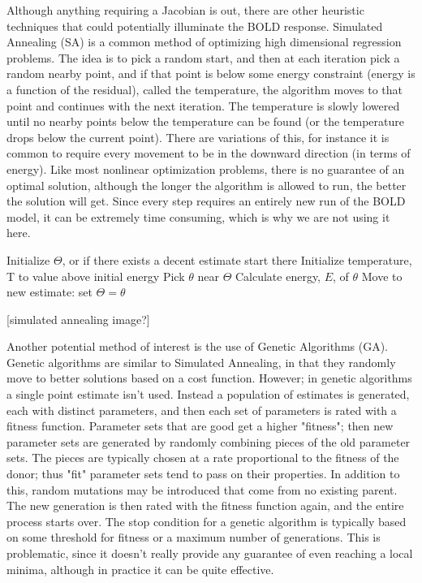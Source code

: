 Although anything requiring a Jacobian is out, there are other heuristic
techniques that could potentially illuminate the BOLD response. 
Simulated Annealing (SA) is a common method of optimizing high dimensional
regression problems. The idea is to pick a random start, and then
at each iteration pick a random nearby point, and if that point is
below some energy constraint (energy is a function of the residual), 
called the temperature, the algorithm moves
to that point and continues with the next iteration. The temperature
is slowly lowered until no nearby points below the temperature can
be found (or the temperature drops below the current point). There are
variations of this, for instance it is common to require every movement
to be in the downward direction (in terms of energy). Like most nonlinear
optimization problems, there is no guarantee of an optimal solution,
although the longer the algorithm is allowed to run, the better the solution
will get. Since every step requires an entirely new run of the 
BOLD model, it can be extremely time consuming, which is why we are
not using it here.

\begin{algorithm}
\caption{Simulated Annealing Algorithm}
\label{alg:Simulated Annealing}
\begin{algorithmic}
\STATE Initialize $\Theta$, or if there exists a decent estimate start there
\STATE Initialize temperature, T to value above initial energy
    \REPEAT
        \STATE Pick $\theta$ near $\Theta$
        \STATE Calculate energy, $E$, of $\theta$
    \STATE Move to new estimate: set $\Theta = \theta$
\ENDWHILE
\end{algorithmic}
\end{algorithm}

[simulated annealing image?]

Another potential method of interest is the use of Genetic Algorithms
(GA). Genetic algorithms are similar to Simulated Annealing, in
that they randomly move to better solutions based on a cost function.
However; in genetic algorithms a single point estimate isn't used. Instead
a population of estimates is generated, each with distinct parameters,
and then each set of parameters is rated with a fitness function. Parameter
sets that are good get a higher "fitness"; then new parameter sets are generated by 
randomly combining pieces of the old parameter sets. The pieces are typically
chosen at a rate proportional to the fitness of the donor; thus "fit"
parameter sets tend to pass on their properties. In addition to this,
random mutations may be introduced that come from no existing parent. 
The new generation is then rated with the fitness function again, and
the entire process starts over. The stop condition for a genetic algorithm
is typically based on some threshold for fitness or a maximum number 
of generations. This is problematic, since it doesn't really provide 
any guarantee of even reaching a local minima, although in practice
it can be quite effective.

